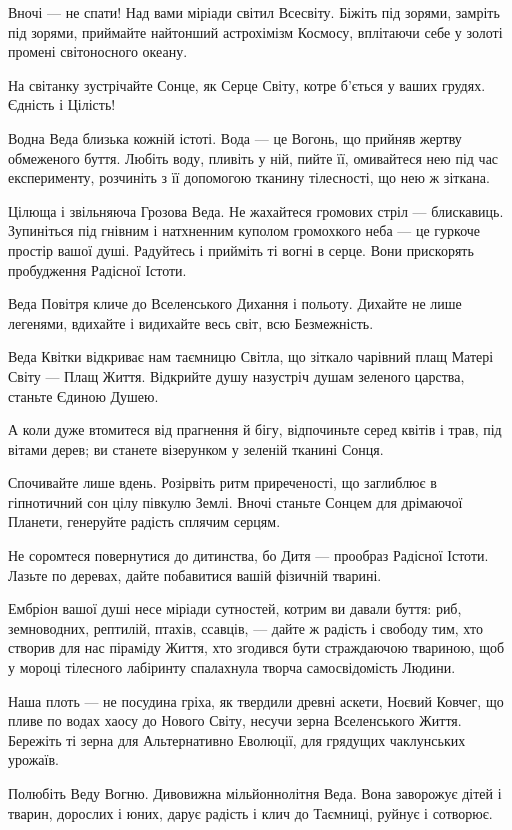 Вночі — не спати! Над вами міріади світил Всесвіту. Біжіть під зорями, замріть
під зорями, приймайте найтонший астрохімізм Космосу, вплітаючи себе у золоті
промені світоносного океану.

На світанку зустрічайте Сонце, як Серце Світу, котре б’ється у ваших грудях.
Єдність і Цілість!

Водна Веда близька кожній істоті. Вода — це Вогонь, що прийняв жертву
обмеженого буття. Любіть воду, пливіть у ній, пийте її, омивайтеся нею під час
експерименту, розчиніть з її допомогою тканину тілесності, що нею ж зіткана.

Цілюща і звільняюча Грозова Веда. Не жахайтеся громових стріл — блискавиць.
Зупиніться під гнівним і натхненним куполом громохкого неба — це гуркоче
простір вашої душі. Радуйтесь і прийміть ті вогні в серце. Вони прискорять
пробудження Радісної Істоти.

Веда Повітря кличе до Вселенського Дихання і польоту. Дихайте не лише легенями,
вдихайте і видихайте весь світ, всю Безмежність.

Веда Квітки відкриває нам таємницю Світла, що зіткало чарівний плащ Матері
Світу — Плащ Життя. Відкрийте душу назустріч душам зеленого царства, станьте
Єдиною Душею.

А коли дуже втомитеся від прагнення й бігу, відпочиньте серед квітів і трав,
під вітами дерев; ви станете візерунком у зеленій тканині Сонця.

Спочивайте лише вдень. Розірвіть ритм приреченості, що заглиблює в гіпнотичний
сон цілу півкулю Землі. Вночі станьте Сонцем для дрімаючої Планети, генеруйте
радість сплячим серцям.

Не соромтеся повернутися до дитинства, бо Дитя — прообраз Радісної Істоти.
Лазьте по деревах, дайте побавитися вашій фізичній тварині.

Ембріон вашої душі несе міріади сутностей, котрим ви давали буття: риб,
земноводних, рептилій, птахів, ссавців, — дайте ж радість і свободу тим, хто
створив для нас піраміду Життя, хто згодився бути страждаючою твариною, щоб у
мороці тілесного лабіринту спалахнула творча самосвідомість Людини.

Наша плоть — не посудина гріха, як твердили древні аскети, Ноєвий Ковчег, що
пливе по водах хаосу до Нового Світу, несучи зерна Вселенського Життя. Бережіть
ті зерна для Альтернативно Еволюції, для грядущих чаклунських урожаїв.

Полюбіть Веду Вогню. Дивовижна мільйоннолітня Веда. Вона заворожує дітей і
тварин, дорослих і юних, дарує радість і клич до Таємниці, руйнує і сотворює.

